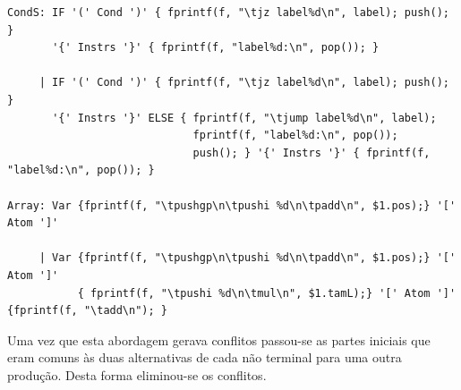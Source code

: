 \documentclass{report}
\begin{document}
\begin{verbatim}
CondS: IF '(' Cond ')' { fprintf(f, "\tjz label%d\n", label); push(); }
	   '{' Instrs '}' { fprintf(f, "label%d:\n", pop()); }

     | IF '(' Cond ')' { fprintf(f, "\tjz label%d\n", label); push(); }
       '{' Instrs '}' ELSE { fprintf(f, "\tjump label%d\n", label);
     			  		     fprintf(f, "label%d:\n", pop()); 
   						     push(); } '{' Instrs '}' { fprintf(f, "label%d:\n", pop()); }

Array: Var {fprintf(f, "\tpushgp\n\tpushi %d\n\tpadd\n", $1.pos);} '[' Atom ']'

     | Var {fprintf(f, "\tpushgp\n\tpushi %d\n\tpadd\n", $1.pos);} '[' Atom ']'
           { fprintf(f, "\tpushi %d\n\tmul\n", $1.tamL);} '[' Atom ']' {fprintf(f, "\tadd\n"); }
\end{verbatim}
Uma vez que esta abordagem gerava conflitos passou-se as partes iniciais que eram comuns às duas alternativas de cada não terminal para uma outra produção. Desta forma eliminou-se os conflitos.\\\\\\\\\\
\end{document}
